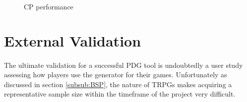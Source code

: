 \documentclass{UoYCSproject}
\begin{document}

    \begin{figure}
      \centering
      \caption{CP performance}
  \end{figure}


\section{External Validation} %
\paragraph{}
The ultimate validation for a successful PDG tool is undoubtedly a user study assessing how players use the generator for their games. Unfortunately as discussed in section \ref{subsub:BSP}, the nature of TRPGs makes acquiring a representative sample size within the timeframe of the project very difficult. 
\end{document}
